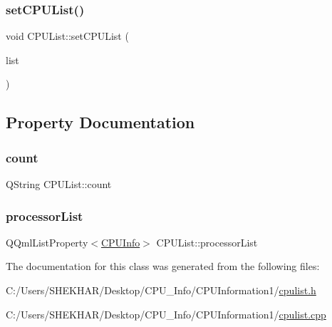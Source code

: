 \subsubsection{\texorpdfstring{set\+C\+P\+U\+List()}{setCPUList()}}
{\footnotesize\ttfamily void C\+P\+U\+List\+::set\+C\+P\+U\+List (\begin{DoxyParamCaption}\item[{Q\+List$<$ \hyperlink{class_c_p_u_info}{C\+P\+U\+Info} $\ast$$>$}]{list }\end{DoxyParamCaption})}



\subsection{Property Documentation}
\mbox{\label{class_c_p_u_list_aa463c60e042b1bd36b18b82cec3b08bc}} 
\subsubsection{\texorpdfstring{count}{count}}
{\footnotesize\ttfamily Q\+String C\+P\+U\+List\+::count\hspace{0.3cm}{\ttfamily [read]}}

\mbox{\label{class_c_p_u_list_a20c077d0f79d4e2fb2141f8aa62950b1}} 
\subsubsection{\texorpdfstring{processor\+List}{processorList}}
{\footnotesize\ttfamily Q\+Qml\+List\+Property$<$\hyperlink{class_c_p_u_info}{C\+P\+U\+Info}$>$ C\+P\+U\+List\+::processor\+List\hspace{0.3cm}{\ttfamily [read]}}



The documentation for this class was generated from the following files\+:\begin{DoxyCompactItemize}
\item 
C\+:/\+Users/\+S\+H\+E\+K\+H\+A\+R/\+Desktop/\+C\+P\+U\+\_\+\+Info/\+C\+P\+U\+Information1/\hyperlink{cpulist_8h}{cpulist.\+h}\item 
C\+:/\+Users/\+S\+H\+E\+K\+H\+A\+R/\+Desktop/\+C\+P\+U\+\_\+\+Info/\+C\+P\+U\+Information1/\hyperlink{cpulist_8cpp}{cpulist.\+cpp}\end{DoxyCompactItemize}
